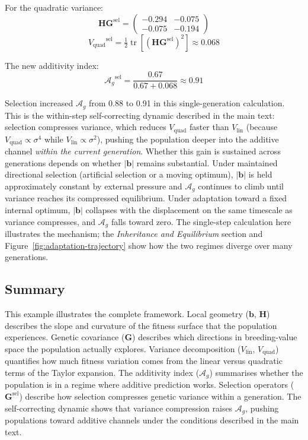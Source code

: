 \documentclass[9pt,twocolumn,twoside,lineno]{gsajnl}
\newcommand{\vect}[1]{\boldsymbol{#1}}
\newcommand{\mat}[1]{\mathbf{#1}}
\newcommand{\tr}{\ensuremath{\operatorname{tr}}\xspace}
\newcommand{\Ag}{\ensuremath{\mathcal{A}_{g}}\xspace}
\newcommand{\Gsel}{\ensuremath{\mat{G}^{\text{sel}}}\xspace}
\newcommand{\Vlin}{\ensuremath{V_{\text{lin}}}\xspace}
\newcommand{\Vquad}{\ensuremath{V_{\text{quad}}}\xspace}
\begin{document}
For the quadratic variance:
\begin{equation}
\mat{H}\Gsel = \begin{pmatrix} -0.294 & -0.075 \\ -0.075 & -0.194 \end{pmatrix}
\end{equation}
\begin{equation}
\Vquad^{\text{sel}} = \tfrac{1}{2}\tr[(\mat{H}\Gsel)^2] \approx 0.068
\end{equation}

The new additivity index:
\begin{equation}
\Ag^{\text{sel}} = \frac{0.67}{0.67 + 0.068} \approx 0.91
\end{equation}

Selection increased \Ag from 0.88 to 0.91 in this single-generation calculation. This is the within-step self-correcting dynamic described in the main text: selection compresses variance, which reduces $\Vquad$ faster than $\Vlin$ (because $\Vquad \propto \sigma^4$ while $\Vlin \propto \sigma^2$), pushing the population deeper into the additive channel \emph{within the current generation}. Whether this gain is sustained across generations depends on whether $|\vect{b}|$ remains substantial. Under maintained directional selection (artificial selection or a moving optimum), $|\vect{b}|$ is held approximately constant by external pressure and \Ag continues to climb until variance reaches its compressed equilibrium. Under adaptation toward a fixed internal optimum, $|\vect{b}|$ collapses with the displacement on the same timescale as variance compresses, and \Ag falls toward zero. The single-step calculation here illustrates the mechanism; the \textit{Inheritance and Equilibrium} section and Figure~\ref{fig:adaptation-trajectory} show how the two regimes diverge over many generations.

\subsection{Summary}

This example illustrates the complete framework. Local geometry ($\vect{b}$, $\mat{H}$) describes the slope and curvature of the fitness surface that the population experiences. Genetic covariance ($\mat{G}$) describes which directions in breeding-value space the population actually explores. Variance decomposition ($\Vlin$, $\Vquad$) quantifies how much fitness variation comes from the linear versus quadratic terms of the Taylor expansion. The additivity index (\Ag) summarises whether the population is in a regime where additive prediction works. Selection operators ($\Gsel$) describe how selection compresses genetic variance within a generation. The self-correcting dynamic shows that variance compression raises \Ag, pushing populations toward additive channels under the conditions described in the main text.
\end{document}
